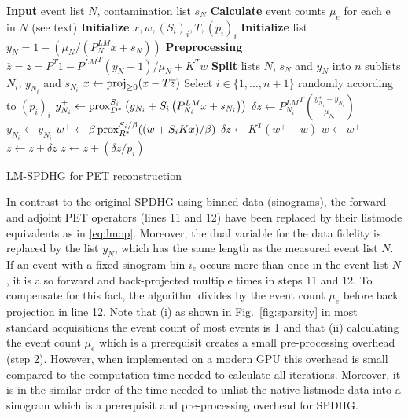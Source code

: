 \begin{algorithm}[t]
\begin{algorithmic}[1]
\small
\State \textbf{Input} event list $N$, contamination list $s_N$
\State \textbf{Calculate} event counts $\mu_e$ for each e in $N$ (see text)
\State \textbf{Initialize} $x,w,(S_i)_i,T,(p_i)_i$
\State \textbf{Initialize} list $y_{N} = 1 - (\mu_N /(P^{LM}_{N} x + s_{N}))$ 
\State \textbf{Preprocessing} $\overline{z} = z = {P^T} 1 - {P^{LM}}^T (y_N-1)/\mu_N + K^T w$ %
\State \textbf{Split} lists $N$, $s_N$ and $y_N$ into $n$ sublists $N_i$, $y_{N_i}$ and $s_{N_i}$
\Repeat
	\State $x \gets \operatorname{proj}_{\geq 0} (x - T \overline{z})$
	\State Select $i \in \{1,\ldots,n+1\}$ randomly according to $(p_i)_i$
	  \State $y_{N_i}^+ \gets \operatorname{prox}_{D^*}^{S_i} \left( y_{N_i} + S_i \left(P^{LM}_{N_i} x + s_{N_i} \right) \right)$
	  \State $\delta z \gets {P^{LM}_{N_i}}^T \left(\frac{y_{N_i}^+ - y_{N_i}}{\mu_{N_i}}\right)$
	  \State $y_{N_i} \gets y_{N_i}^+$
  \Else
	  \State $w^+ \gets \beta \operatorname{prox}_{R^*}^{S_i/\beta} ((w + S_i  K x)/\beta)$
	  \State $\delta z \gets K^T \left(w^+ - w\right)$
	  \State $w \gets w^+$
  \EndIf
	\State $z \gets z + \delta z$
	\State $\overline{z} \gets  z + (\delta z/p_i)$
\State {}
\end{algorithmic}
\caption{LM-SPDHG for PET reconstruction}
\label{alg:lmspdhg}
\end{algorithm}


In contrast to the original SPDHG using binned data (sinograms), the forward and adjoint
PET operators (lines 11 and 12) have been replaced by their listmode equivalents as in \eqref{eq:lmop}.
Moreover, the dual variable for the data fidelity is replaced by the list $y_N$, which has the
same length as the measured event list $N$.
If an event with a fixed sinogram bin $i_e$ occurs more than once in the event list
$N$, it is also forward and back-projected multiple times in steps 11 and 12.
To compensate for this fact, the algorithm divides by the event count $\mu_e$ before back projection
in line 12.
Note that (i) as shown in Fig.~\ref{fig:sparsity} in most standard acquisitions the event count
of most events is 1 and that (ii) calculating the event count $\mu_e$ which is a prerequisit
creates a small pre-processing overhead (step 2).
However, when implemented on a modern GPU this overhead is small compared to the computation
time needed to calculate all iterations.
Moreover, it is in the similar order of the time needed to unlist the native listmode data into
a sinogram which is a prerequisit and pre-processing overhead for SPDHG.

